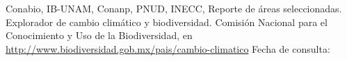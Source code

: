 \begin{titlepage}






\begin{flushleft}
\small{Conabio, IB-UNAM, Conanp, PNUD, INECC, Reporte de \'areas seleccionadas. Explorador de cambio clim\'atico y biodiversidad. Comisi\'on Nacional para el Conocimiento y Uso de la Biodiversidad, en \url{http://www.biodiversidad.gob.mx/pais/cambio-climatico} Fecha de consulta: }
\bigskip
\end{flushleft}




\end{titlepage}
